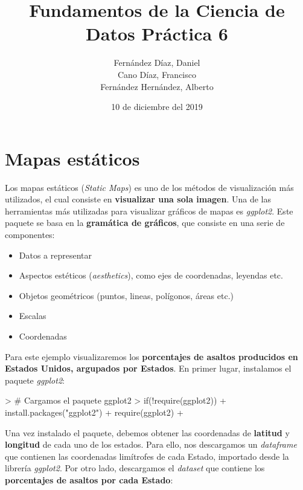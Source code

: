 \documentclass [a4paper] {article}
\title{\textbf{Fundamentos de la Ciencia de Datos Práctica 6}}
\author{
	Fernández Díaz, Daniel\\
	Cano Díaz, Francisco\\
	Fernández Hernández, Alberto\\
}
\date{10 de diciembre del 2019}
\begin{document}

\maketitle
\newpage
\tableofcontents
\newpage
\section{Mapas estáticos}
Los mapas estáticos (\textit{Static Maps}) es uno de los métodos de visualización más utilizados, el cual consiste en \textbf{visualizar una sola imagen}. Una de las herramientas  más utilizadas para visualizar gráficos de mapas es \textit{ggplot2}. Este paquete se basa en la \textbf{gramática de gráficos}, que consiste en una serie de componentes:
\begin{itemize}
  \item Datos a representar
  \item Aspectos estéticos (\textit{aesthetics}), como ejes de coordenadas, leyendas etc.
  \item Objetos geométricos (puntos, lineas, polígonos, áreas etc.)
  \item Escalas
  \item Coordenadas
\end{itemize}
Para este ejemplo visualizaremos los \textbf{porcentajes de asaltos producidos en Estados Unidos, argupados por Estados}. En primer lugar, instalamos el paquete \textit{ggplot2}:
\begin{Schunk}
\begin{Sinput}
> # Cargamos el paquete ggplot2
> if(!require(ggplot2)){
+   install.packages("ggplot2")
+   require(ggplot2)
+ }
\end{Sinput}
\end{Schunk}

Una vez instalado el paquete, debemos obtener las coordenadas de \textbf{latitud} y \textbf{longitud} de cada uno de los estados. Para ello, nos descargamos un \textit{dataframe} que contienen las coordenadas limítrofes de cada Estado, importado desde la librería \textit{ggplot2}. Por otro lado, descargamos el \textit{dataset} que contiene los \textbf{porcentajes de asaltos por cada Estado}:
\end{document}
